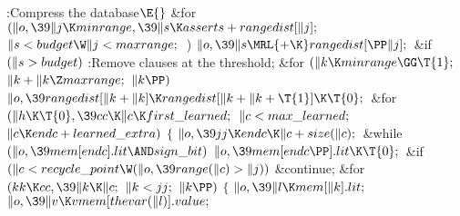 \B{}:Compress the database\X${}\E{}$\6
\&{for} ${}(\|o,\39\|j\K\\{minrange},\39\|s\K\\{asserts}+\\{rangedist}[\|j];{}$
${}\|s<\\{budget}\W\|j<\\{maxrange};{}$ \,)\1\5
${}\|o,\39\|s\MRL{+{\K}}\\{rangedist}[\PP\|j];{}$\2\6
\&{if} ${}(\|s>\\{budget}){}$\1\5
:Remove  clauses at the threshold\X;\2\6
\&{for} ${}(\|k\K\\{minrange}\GG\T{1};{}$ ${}\|k+\|k\Z\\{maxrange};{}$ ${}\|k%
\PP){}$\1\5
${}\|o,\39\\{rangedist}[\|k+\|k]\K\\{rangedist}[\|k+\|k+\T{1}]\K\T{0};{}$\2\6
\&{for} ${}(\|h\K\T{0},\39\\{cc}\K\|c\K\\{first\_learned};{}$ ${}\|c<\\{max%
\_learned};{}$ ${}\|c\K\\{endc}+\\{learned\_extra}){}$\5
${}\{{}$\1\6
${}\|o,\39\\{jj}\K\\{endc}\K\|c+\\{size}(\|c);{}$\6
\&{while} ${}(\|o,\39\\{mem}[\\{endc}].\\{lit}\AND\\{sign\_bit}){}$\1\5
${}\|o,\39\\{mem}[\\{endc}\PP].\\{lit}\K\T{0};{}$\2\6
\&{if} ${}(\|c<\\{recycle\_point}\W(\|o,\39\\{range}(\|c)>\|j)){}$\1\5
\&{continue};\2\6
\&{for} ${}(\\{kk}\K\\{cc},\39\|k\K\|c;{}$ ${}\|k<\\{jj};{}$ ${}\|k\PP){}$\5
${}\{{}$\1\6
${}\|o,\39\|l\K\\{mem}[\|k].\\{lit};{}$\6
${}\|o,\39\|v\K\\{vmem}[\\{thevar}(\|l)].\\{value};{}$\6
